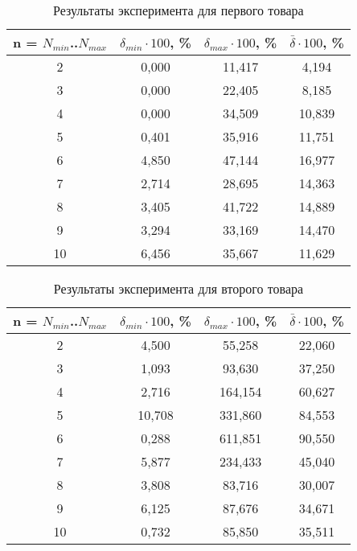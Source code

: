 \documentclass[a4paper]{bmstu}
\begin{document}
\begin{table}[H]
	\caption{Результаты эксперимента для первого товара}
	\begin{center}
		\begin{tabular}{| c | c | c | c |} 
			\hline
			
			\textbf{n = $N_{min}$..$N_{max}$} & \textbf{$\delta_{min} \cdot 100$, \%} & \textbf{$\delta_{max} \cdot 100$, \%} & \textbf{$\bar{\delta} \cdot 100$, \%} \\  
			
			\hline
			2 & 0,000 & 11,417 & 4,194\\
			\hline
			3 & 0,000 & 22,405 & 8,185\\
			\hline
			4 & 0,000 & 34,509 & 10,839\\
			\hline
			5 & 0,401 & 35,916 & 11,751\\
			\hline
			6 & 4,850 & 47,144 & 16,977\\
			\hline
			7 & 2,714 & 28,695 & 14,363\\
			\hline
			8 & 3,405 & 41,722 & 14,889\\
			\hline
			9 & 3,294 & 33,169 & 14,470\\
			\hline
			10 & 6,456 & 35,667 & 11,629\\
			\hline
		\end{tabular}
	\end{center}
\end{table}

\begin{table}[H]
	\caption{Результаты эксперимента для второго товара}
	\begin{center}
		\begin{tabular}{| c | c | c | c |} 
			\hline
			
			\textbf{n = $N_{min}$..$N_{max}$} & \textbf{$\delta_{min} \cdot 100$, \%} & \textbf{$\delta_{max} \cdot 100$, \%} & \textbf{$\bar{\delta} \cdot 100$, \%} \\   
			
			\hline
			2 & 4,500 & 55,258 & 22,060\\
			\hline
			3 & 1,093 & 93,630 & 37,250\\
			\hline
			4 & 2,716 & 164,154 & 60,627\\
			\hline
			5 & 10,708 & 331,860 & 84,553\\
			\hline
			6 & 0,288 & 611,851 & 90,550\\
			\hline
			7 & 5,877 & 234,433 & 45,040\\
			\hline
			8 & 3,808 & 83,716 & 30,007\\
			\hline
			9 & 6,125 & 87,676 & 34,671\\
			\hline
			10 & 0,732 & 85,850 & 35,511\\
			\hline
		\end{tabular}
	\end{center}
\end{table}
\end{document}
